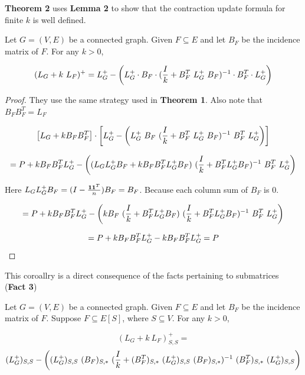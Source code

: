 \textbf{Theorem 2} uses \textbf{Lemma 2} to show that the contraction update formula for finite $k$ is well defined. 

\begin{HXt}
 Let $G = (V, E)$ be a connected graph. Given $F \subseteq E$ and let $B_F$ be the incidence matrix of $F$. For any $k > 0$,
 
 $$ (L_G + k \ L_F)^+ = \laplacian - \left(\laplacian \cdot B_F \cdot (\frac{I}{k} + B_F^T \ \laplacian \ B_F)^{-1} \cdot B_F^T \cdot \laplacian \right)$$
 
\end{HXt}

\begin{proof}
 They use the same strategy used in \textbf{Theorem 1}. Also note that $B_F B_F^T = L_F$
 
 $$\left[L_G + k B_F B_F^T \right] \cdot \left[\laplacian - \left(\laplacian \  B_F \  (\frac{I}{k} + B_F^T \ \laplacian \ B_F)^{-1} \  B_F^T \  \laplacian \right) \right]$$

 
$$= P + k B_F B_F^T L_{G}^{+} - \left( (L_GL_{G}^{+} B_F + kB_F B_F^T L_{G}^{+} B_F)\ (\frac{I}{k} + B_F^T L_{G}^{+} B_F)^{-1} \ B_F^T \ L_{G}^{+} \right)$$

Here $L_G L_{G}^{+} B_F = (I - \frac{\textbf{1} \textbf{1}^T}{n}) B_F = B_F$. Because each column sum of $B_F$ is 0.

$$ = P + k B_F B_F^T L_{G}^{+} - \left( k B_F \ (\frac{I}{k} + B_F^T L_{G}^{+} B_F) \ (\frac{I}{k} + B_F^T L_{G}^{+} B_F)^{-1} \ B_F^T \ L_{G}^{+} \right)$$ 

$$ = P + k B_F B_F^T L_{G}^{+} - k B_F B_F^T L_{G}^{+}  = P$$
 
 \end{proof}

This coroallry is a direct consequence of the facts pertaining to submatrices (\textbf{Fact 3})
\begin{HXc}
 Let $G = (V, E)$ be a connected graph. Given $F \subseteq E$ and let $B_F$ be the incidence matrix of $F$. Suppose $F \subseteq E[S]$, where $S \subseteq V$. For any $k > 0$,
 
  $$ (L_G + k \ L_F)^+_{S,S} = $$
  $$(L_{G}^{+})_{S,S} - \left((L_{G}^{+})_{S,S} \  (B_F)_{S,*} \  (\frac{I}{k} + (B_F^T)_{S,*} \ (L_{G}^{+})_{S,S} \ (B_F)_{S,*})^{-1} \   (B_F^T)_{S,*} \  (L_{G}^{+} )_{S,S} \right)$$
 
\end{HXc}

